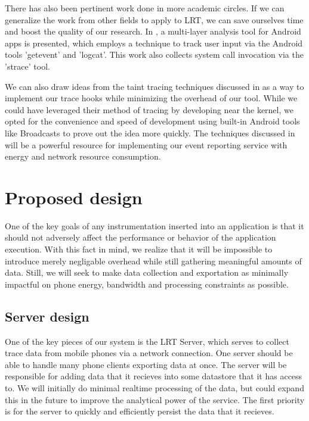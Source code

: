 \documentclass{acm_proc_article-sp}
\begin{document}
There has also been pertinent work done in more academic circles. If we can 
generalize the work from other fields to apply to LRT, we can save ourselves 
time and boost the quality of our research. In \cite{ProfileDroid}, a 
multi-layer analysis tool for Android apps is presented, which employs a 
technique to track user input via the Android tools 'getevent' and 'logcat'. 
This work also collects system call invocation via the 'strace' tool. 

We can also draw ideas from the taint tracing techniques discussed in 
\cite{TaintDroid} as a way to implement our trace hooks while minimizing 
the overhead of our tool. While we could have leveraged their method of 
tracing by developing near the kernel, we opted for the convenience and 
speed of development using built-in Android tools like Broadcasts to prove
out the idea more quickly. The techniques discussed in \cite{PeriodicTransfers}
will be a powerful resource for implementing our event reporting service 
with energy and network resource consumption.

\section{Proposed design}
\label{section:proposeddesign}
One of the key goals of any instrumentation inserted into an application is 
that it should not adversely affect the performance or behavior of the 
application execution. With this fact in mind, we realize that it will be 
impossible to introduce merely negligable overhead while still gathering
meaningful amounts of data. Still, we will seek to make data collection
and exportation as minimally impactful on phone energy, bandwidth and processing
constraints as possible.

\subsection{Server design}
One of the key pieces of our system is the LRT Server, which serves
to collect trace data from mobile phones via a network connection.
One server should be able to handle many phone clients exporting data at once.
The server will be responsible for adding data that it recieves into
some datastore that it has access to. We will initially do minimal realtime
processing of the data, but could expand this in the future to improve the
analytical power of the service. The first priority is for the server to quickly
and efficiently persist the data that it recieves.
\end{document}
